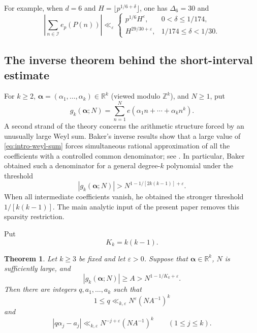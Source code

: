 \documentclass[11pt,reqno]{amsart}
\numberwithin{equation}{section}
\newtheorem{theorem}{Theorem}[section]
\theoremstyle{definition}
\theoremstyle{remark}
\begin{document}
For example, when $d=6$ and $H=\lfloor p^{1/6+\delta}\rfloor$, one has
$\Delta_6=30$ and
\begin{equation}\label{eq:degree-six-intro}
  \left|\sum_{n\in\mathcal I}e_p(P(n))\right|
  \ll_{\varepsilon}
  \begin{cases}
    p^{1/6}H^\varepsilon,&0<\delta\le1/174,\\[1mm]
    H^{29/30+\varepsilon},&1/174\le\delta<1/30.
  \end{cases}
\end{equation}

\subsection{The inverse theorem behind the short-interval estimate}

For $k\ge2$, $\boldsymbol\alpha=(\alpha_1,\ldots,\alpha_k)\in\mathbb R^k$
(viewed modulo $\mathbb Z^k$), and $N\ge1$, put
\begin{equation}\label{eq:intro-weyl-sum}
  g_k(\boldsymbol\alpha;N)
  =\sum_{n=1}^{N}e(\alpha_1n+\cdots+\alpha_kn^k).
\end{equation}
A second strand of the theory concerns the arithmetic structure forced by an
unusually large Weyl sum.  Baker's inverse results show that a large value of
\eqref{eq:intro-weyl-sum} forces simultaneous rational approximation of all
the coefficients with a controlled common denominator; see
\cite{Baker1982,Baker1992,Baker1986,Baker2016}.  In particular, Baker
\cite[Theorem~4]{Baker2016} obtained such a denominator for a general
degree-$k$ polynomial under the threshold
\[
  |g_k(\boldsymbol\alpha;N)|
  >N^{1-1/[2k(k-1)]+\varepsilon}.
\]
When all intermediate coefficients vanish, he obtained the stronger
threshold $1/[k(k-1)]$.  The main analytic input of the present paper removes
this sparsity restriction.

Put
\begin{equation}\label{eq:Kk-definition}
  K_k=k(k-1).
\end{equation}

\begin{theorem}\label{thm:inverse-main}
Let $k\ge3$ be fixed and let $\varepsilon>0$.  Suppose that
$\boldsymbol\alpha\in\mathbb R^k$, $N$ is sufficiently large, and
\begin{equation}\label{eq:inverse-hypothesis}
  |g_k(\boldsymbol\alpha;N)|\ge A
  >N^{1-1/K_k+\varepsilon}.
\end{equation}
Then there are integers $q,a_1,\ldots,a_k$ such that
\begin{equation}\label{eq:inverse-q}
  1\le q\ll_{k,\varepsilon}
  N^\varepsilon(NA^{-1})^k
\end{equation}
and
\begin{equation}\label{eq:inverse-coefficients}
  |q\alpha_j-a_j|
  \ll_{k,\varepsilon}
  N^{-j+\varepsilon}(NA^{-1})^k
  \qquad(1\le j\le k).
\end{equation}
\end{theorem}
\end{document}
